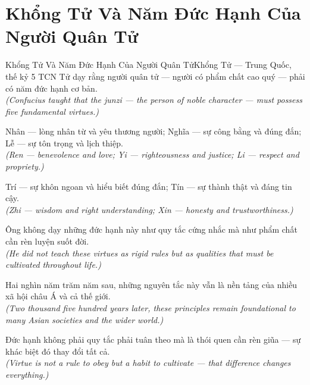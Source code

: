 \section{Khổng Tử Và Năm Đức Hạnh Của Người Quân Tử}
\begin{truyen}{Khổng Tử Và Năm Đức Hạnh Của Người Quân Tử}{Khổng Tử --- Trung Quốc, thế kỷ 5 TCN}
 Tử dạy rằng người quân tử --- người có phẩm chất cao quý --- phải có năm đức hạnh cơ bản.\\[4pt]
\textit{(Confucius taught that the junzi --- the person of noble character --- must possess five fundamental virtues.)}

Nhân --- lòng nhân từ và yêu thương người; Nghĩa --- sự công bằng và đúng đắn; Lễ --- sự tôn trọng và lịch thiệp.\\[4pt]
\textit{(Ren --- benevolence and love; Yi --- righteousness and justice; Li --- respect and propriety.)}

Trí --- sự khôn ngoan và hiểu biết đúng đắn; Tín --- sự thành thật và đáng tin cậy.\\[4pt]
\textit{(Zhi --- wisdom and right understanding; Xin --- honesty and trustworthiness.)}

Ông không dạy những đức hạnh này như quy tắc cứng nhắc mà như phẩm chất cần rèn luyện suốt đời.\\[4pt]
\textit{(He did not teach these virtues as rigid rules but as qualities that must be cultivated throughout life.)}

Hai nghìn năm trăm năm sau, những nguyên tắc này vẫn là nền tảng của nhiều xã hội châu Á và cả thế giới.\\[4pt]
\textit{(Two thousand five hundred years later, these principles remain foundational to many Asian societies and the wider world.)}

\end{truyen}
\begin{baihoc}
  Đức hạnh không phải quy tắc phải tuân theo mà là thói quen cần rèn giũa --- sự khác biệt đó thay đổi tất cả.\\[4pt]
  \textit{(Virtue is not a rule to obey but a habit to cultivate --- that difference changes everything.)}
\end{baihoc}

